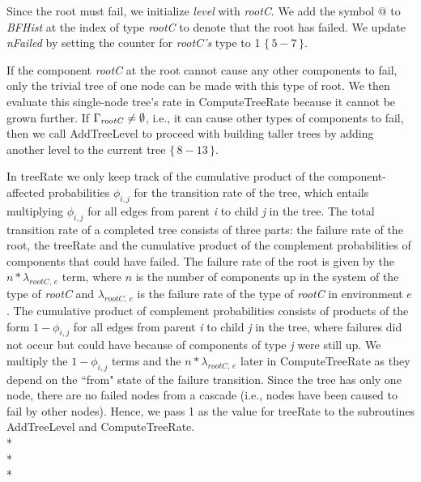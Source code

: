 \documentclass[12pt]{article}
\newcommand{\varName}[1]{\textrm{\it#1}}
\newcommand{\citeBlock}[2]{$\{\,#1 - #2\,\}$}
\begin{document}
Since the root must fail, we initialize \textit{level} with \textit{rootC}. We add the symbol @ to \textit{BFHist} at the index of type \textit{rootC} to denote that the root has failed. We update \textit{nFailed} by setting the counter for \varName{rootC's} type to 1 \citeBlock{5}{7}.

If the component \textit{rootC} at the root cannot cause any other components to fail, only the trivial tree of one node can be made with this type of root. We then evaluate this single-node tree's rate in ComputeTreeRate because it cannot be grown further. If $\Gamma_{\textrm{\textit{rootC}}} \neq \emptyset$, i.e., it can cause other types of components to fail, then we call AddTreeLevel to proceed with building taller trees by adding another level to the current tree \citeBlock{8}{13}.

In treeRate we only keep track of the cumulative product of the component-affected probabilities $\phi_{i,j}$ for the transition rate of the tree, which entails multiplying $\phi_{i, j}$ for all edges from parent \varName{i} to child \varName{j} in the tree. The total transition rate of a completed tree consists of three parts: the failure rate of the root, the treeRate and the cumulative product of the complement probabilities of components that could have failed. The failure rate of the root is given by the $n*\lambda_{rootC, \,e}$ term, where $n$ is the number of components up in the system of the type of \varName{rootC} and $\lambda_{rootC, \,e}$ is the failure rate of the type of \varName{rootC} in environment $e$. The cumulative product of complement probabilities consists of products of the form $1-\phi_{i, j}$ for all edges from parent \varName{i} to child \varName{j} in the tree, where failures did not occur but could have because of components of type \varName{j} were still up. We multiply the $1-\phi_{i,j}$ terms and the $n*\lambda_{rootC, \,e}$ later in ComputeTreeRate as they depend on the ``from" state of the failure transition. Since the tree has only one node, there are no failed nodes from a cascade (i.e., nodes have been caused to fail by other nodes). Hence, we pass 1 as the value for treeRate to the subroutines AddTreeLevel and ComputeTreeRate.
\\*\\*\\*
\end{document}
